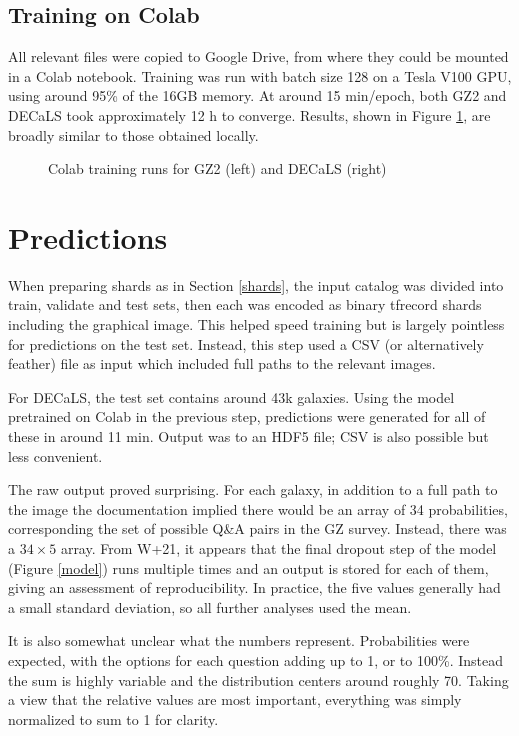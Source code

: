 \documentclass[preprint]{aastex631}
\begin{document}
\subsection{Training on Colab}

All relevant files were copied to Google Drive, from where they could be mounted in a Colab notebook. Training was run with batch size 128 on a Tesla V100 GPU, using around 95\% of the 16GB memory. At around 15 min/epoch, both GZ2 and DECaLS took approximately 12 h to converge. Results, shown in Figure \ref{fig:train_colab}, are broadly similar to those obtained locally.

\begin{figure}
	\caption{Colab training runs for GZ2 (left) and DECaLS (right) \label{fig:train_colab}}
\end{figure}


\section{Predictions}

When preparing shards as in Section \ref{shards}, the input catalog was divided into train, validate and test sets, then each was encoded as binary tfrecord shards including the graphical image. This helped speed training but is largely pointless for predictions on the test set. Instead, this step used a CSV (or alternatively feather) file as input which included full paths to the relevant images.

For DECaLS, the test set contains around 43k galaxies. Using the model pretrained on Colab in the previous step, predictions were generated for all of these in around 11 min. Output was to an HDF5 file; CSV is also possible but less convenient.

The raw output proved surprising. For each galaxy, in addition to a full path to the image the documentation implied there would be an array of 34 probabilities, corresponding the set of possible Q\&A pairs in the GZ survey. Instead, there was a $34 \times 5$ array. From W+21, it appears that the final dropout step of the model (Figure \ref{model}) runs multiple times and an output is stored for each of them, giving an assessment of reproducibility. In practice, the five values generally had a small standard deviation, so all further analyses used the mean.

It is also somewhat unclear what the numbers represent. Probabilities were expected, with the options for each question adding up to 1, or to 100\%. Instead the sum is highly variable and the distribution centers around roughly 70. Taking a view that the relative values are most important, everything was simply normalized to sum to 1 for clarity. 
\end{document}

